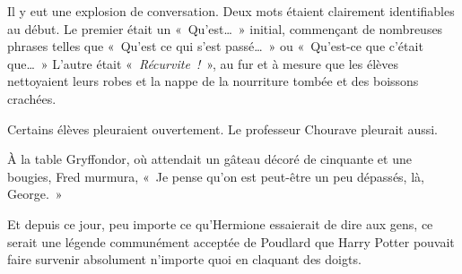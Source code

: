 Il y eut une explosion de conversation.
Deux mots étaient clairement identifiables au début.
Le premier était un «~Qu'est…~»
initial, commençant de nombreuses phrases telles que «~Qu'est ce qui s'est passé…~»
ou «~Qu'est-ce que c'était que…~»
 L'autre était «~\emph{Récurvite~!}~», au fur et à mesure que les élèves nettoyaient leurs robes et la nappe de la nourriture tombée et des boissons crachées.

Certains élèves pleuraient ouvertement.
Le professeur Chourave pleurait aussi.

À la table Gryffondor, où attendait un gâteau décoré de cinquante et une bougies, Fred murmura, «~Je pense qu'on est peut-être un peu dépassés, là, George.~»

Et depuis ce jour, peu importe ce qu'Hermione essaierait de dire aux gens, ce serait une légende communément acceptée de Poudlard que Harry Potter pouvait faire survenir absolument n'importe quoi en claquant des doigts.~
